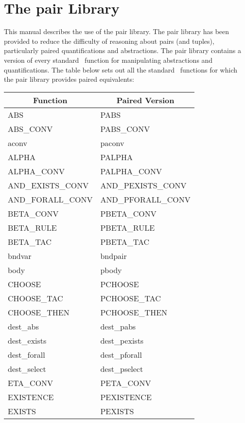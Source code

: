 \chapter{The pair Library}

This manual describes the use of the pair library.
The pair library has been provided to reduce the difficulty of reasoning
about pairs (and tuples), particularly paired quantifications and abstractions.
The pair library contains a version of every standard \HOL\ function
for manipulating abstractions and quantifications.
The table below sets out all the standard \HOL\ functions for which the
pair library provides paired equivalents:
{\tiny \begin{center}
	\begin{tabular}[t]{|l|l|}											\hline
		\multicolumn{1}{|c|}{\normalsize Function}
	&	\multicolumn{1}{|c|}{\normalsize Paired Version}\\				\hline
		ABS							&	PABS						\\
		ABS\_CONV					&	PABS\_CONV					\\
		aconv						&	paconv						\\
		ALPHA						&	PALPHA						\\
		ALPHA\_CONV					&	PALPHA\_CONV				\\
		AND\_EXISTS\_CONV			&	AND\_PEXISTS\_CONV			\\
		AND\_FORALL\_CONV			&	AND\_PFORALL\_CONV			\\
		BETA\_CONV					&	PBETA\_CONV					\\
		BETA\_RULE					&	PBETA\_RULE					\\
		BETA\_TAC					&	PBETA\_TAC					\\
		bndvar						&	bndpair						\\
		body						&	pbody						\\
		CHOOSE						&	PCHOOSE						\\
		CHOOSE\_TAC					&	PCHOOSE\_TAC				\\
		CHOOSE\_THEN				&	PCHOOSE\_THEN				\\
		dest\_abs					&	dest\_pabs					\\
		dest\_exists				&	dest\_pexists				\\
		dest\_forall				&	dest\_pforall				\\
		dest\_select				&	dest\_pselect				\\
		ETA\_CONV					&	PETA\_CONV					\\
		EXISTENCE					&	PEXISTENCE					\\
		EXISTS						&	PEXISTS						\\

\end{tabular}
\end{center}}
